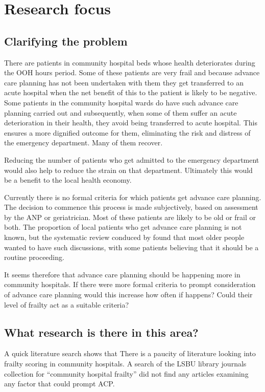 \documentclass
[
	12pt,
	a4paper,
	oneside,
]{report}
\begin{document}
\section{Research focus}

\subsection{Clarifying the problem}

There are patients in community hospital beds whose health deteriorates during
the OOH hours period. Some of these patients are very frail and because advance
care planning has not been undertaken with them they get transferred to an acute 
hospital when the net benefit of this to the patient is likely to be negative.
Some patients in the community hospital wards do have such advance care planning 
carried out and subsequently, when some of them suffer an acute deterioration in
their health, they avoid being transferred to acute hospital. This ensures a more
dignified outcome for them, eliminating the risk and distress of the emergency
department. Many of them recover.

Reducing the number of patients who get admitted to the emergency department would
also help to reduce the strain on that department. Ultimately this would be a
benefit to the local health economy.

Currently there is no formal criteria for which patients get advance care planning.
The decision to commence this process is made subjectively, based on assessment 
by the ANP or geriatrician. Most of these patients are likely to be old or frail
or both. The proportion of local patients who get advance care planning is not known,
but the systematic review conduced by \textcite{sharp:13} found that most older
people wanted to have such discussions, with some patients believing that it 
should be a routine proceeding.

It seems therefore that advance care planning should be happening more in community
hospitals. If there were more formal criteria to prompt consideration
of advance care planning would this increase how often if happens? Could their 
level of frailty act as a suitable criteria?

\subsection{What research is there in this area?}

A quick literature search shows that There is a paucity of literature looking 
into frailty scoring in community hospitals.
A search of the LSBU library journals collection for ``community hospital frailty''
did not find any articles examining any factor that could prompt ACP.
\end{document}
